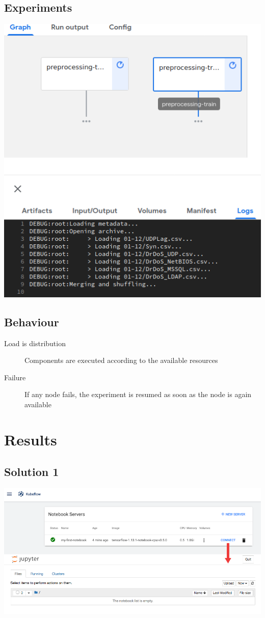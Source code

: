 \documentclass[11pt]{article}
\begin{document}
\subsection*{Experiments}
\label{sec:orge71dd86}
\begin{center}
\includegraphics[width=.9\linewidth]{./img/experiment.png}
\end{center}
\subsection*{Behaviour}
\label{sec:org0dba2ce}
\begin{description}
\item[{Load is distribution}] Components are executed according to the
available resources
\item[{Failure}] If any node fails, the experiment is resumed as soon as
the node is again available
\end{description}
\section*{Results}
\label{sec:orgc7a53fd}
\subsection*{Solution 1}
\label{sec:org8b54218}
\begin{center}
\includegraphics[width=.9\linewidth]{./img/solution1.png}
\end{center}
\end{document}
